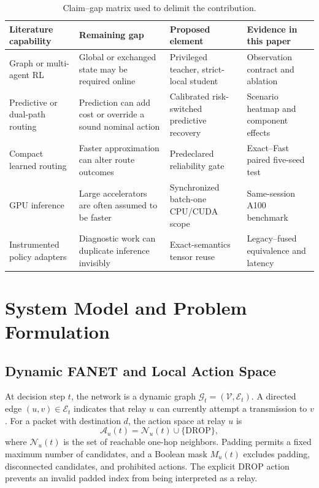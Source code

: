 \documentclass[drones,article,submit,moreauthors]{Definitions/mdpi}
\newcommand{\drop}{\mathrm{DROP}}
\begin{document}
\begin{table}[H]
\caption{Claim--gap matrix used to delimit the contribution.}
\label{tab:novelty}
\centering\small
\begin{tabularx}{\textwidth}{p{}p{}p{}X}
\toprule
Literature capability & Remaining gap & Proposed element & Evidence in this paper \\
\midrule
Graph or multi-agent RL & Global or exchanged state may be required online & Privileged teacher, strict-local student & Observation contract and ablation \\
Predictive or dual-path routing & Prediction can add cost or override a sound nominal action & Calibrated risk-switched predictive recovery & Scenario heatmap and component effects \\
Compact learned routing & Faster approximation can alter route outcomes & Predeclared reliability gate & Exact--Fast paired five-seed test \\
GPU inference & Large accelerators are often assumed to be faster & Synchronized batch-one CPU/CUDA scope & Same-session A100 benchmark \\
Instrumented policy adapters & Diagnostic work can duplicate inference invisibly & Exact-semantics tensor reuse & Legacy--fused equivalence and latency \\
\bottomrule
\end{tabularx}
\end{table}

\section{System Model and Problem Formulation}

\subsection{Dynamic FANET and Local Action Space}

At decision step $t$, the network is a dynamic graph $\mathcal{G}_t=(\mathcal{V},\mathcal{E}_t)$. A directed edge $(u,v)\in\mathcal{E}_t$ indicates that relay $u$ can currently attempt a transmission to $v$. For a packet with destination $d$, the action space at relay $u$ is
\begin{equation}
\mathcal{A}_u(t)=\mathcal{N}_u(t)\cup\{\drop\},
\end{equation}
where $\mathcal{N}_u(t)$ is the set of reachable one-hop neighbors. Padding permits a fixed maximum number of candidates, and a Boolean mask $M_u(t)$ excludes padding, disconnected candidates, and prohibited actions. The explicit $\drop$ action prevents an invalid padded index from being interpreted as a relay.
\end{document}
